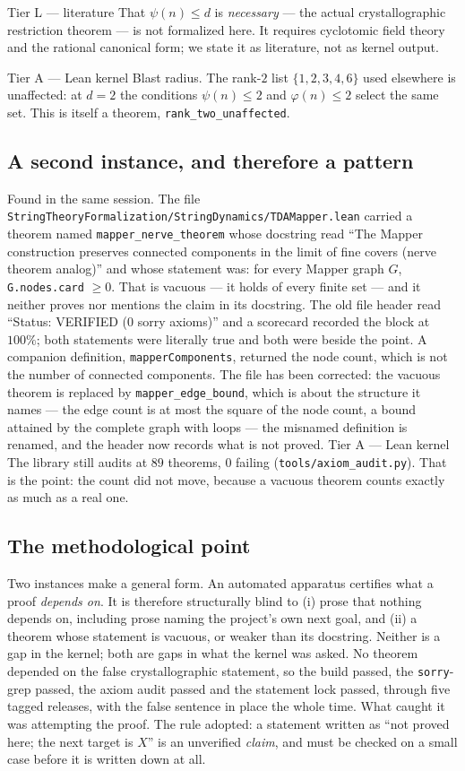 \documentclass[11pt,a4paper]{article}
\theoremstyle{remark}
\newcommand{\tierA}{\colorbox{green!15}{\textsf{\scriptsize Tier A --- Lean kernel}}}
\newcommand{\tierL}{\colorbox{blue!10}{\textsf{\scriptsize Tier L --- literature}}}
\newcommand{\lean}[1]{\texttt{#1}}
\begin{document}
\tierL{} That $\psi(n) \le d$ is \emph{necessary} --- the actual crystallographic
restriction theorem --- is not formalized here. It requires cyclotomic field theory
and the rational canonical form; we state it as literature, not as kernel output.

\tierA{} Blast radius. The rank-$2$ list $\{1,2,3,4,6\}$ used elsewhere is
unaffected: at $d = 2$ the conditions $\psi(n) \le 2$ and $\varphi(n) \le 2$ select
the same set. This is itself a theorem, \lean{rank\_two\_unaffected}.

\subsection*{A second instance, and therefore a pattern}

Found in the same session. The file
\lean{StringTheoryFormalization/StringDynamics/TDAMapper.lean} carried a theorem
named \lean{mapper\_nerve\_theorem} whose docstring read ``The Mapper construction
preserves connected components in the limit of fine covers (nerve theorem analog)''
and whose statement was: for every Mapper graph $G$, \lean{G.nodes.card} $\ge 0$.
That is vacuous --- it holds of every finite set --- and it neither proves
nor mentions the claim in its docstring. The old file header read ``Status: VERIFIED
(0 sorry axioms)'' and a scorecard recorded the block at $100\%$; both statements
were literally true and both were beside the point. A companion definition,
\lean{mapperComponents}, returned the node count, which is not the number of
connected components. The file has been corrected: the vacuous theorem is replaced by
\lean{mapper\_edge\_bound}, which is about the structure it names --- the edge count is
at most the square of the node count, a bound attained by the complete graph with
loops --- the misnamed definition is renamed, and the header now records what is not
proved. \tierA{} The library still audits at $89$ theorems, $0$ failing
(\lean{tools/axiom\_audit.py}). That is the point: the count did not move, because a
vacuous theorem counts exactly as much as a real one.

\subsection*{The methodological point}

Two instances make a general form. An automated apparatus certifies what a proof
\emph{depends on}. It is therefore structurally blind to (i) prose that nothing
depends on, including prose naming the project's own next goal, and (ii) a theorem
whose statement is vacuous, or weaker than its docstring. Neither is a gap in the
kernel; both are gaps in what the kernel was asked. No theorem depended on the false
crystallographic statement, so the build passed, the \texttt{sorry}-grep passed, the
axiom audit passed and the statement lock passed, through five tagged releases, with
the false sentence in place the whole time. What caught it was attempting the proof.
The rule adopted: a statement written as ``not proved here; the next target is $X$''
is an unverified \emph{claim}, and must be checked on a small case before it is
written down at all.
\end{document}

